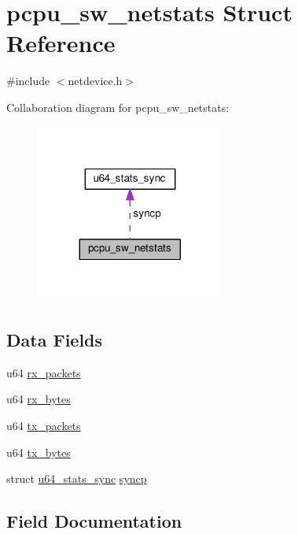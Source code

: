 \hypertarget{structpcpu__sw__netstats}{}\section{pcpu\+\_\+sw\+\_\+netstats Struct Reference}
\label{structpcpu__sw__netstats}


{\ttfamily \#include $<$netdevice.\+h$>$}



Collaboration diagram for pcpu\+\_\+sw\+\_\+netstats\+:
\nopagebreak
\begin{figure}[H]
\begin{center}
\leavevmode
\includegraphics[width=176pt]{structpcpu__sw__netstats__coll__graph}
\end{center}
\end{figure}
\subsection*{Data Fields}
\begin{DoxyCompactItemize}
\item 
u64 \hyperlink{structpcpu__sw__netstats_aef09f7c9a31a557c278f7768f6d54488}{rx\+\_\+packets}
\item 
u64 \hyperlink{structpcpu__sw__netstats_ae71ad7ad7c404b7820d022d42c515a70}{rx\+\_\+bytes}
\item 
u64 \hyperlink{structpcpu__sw__netstats_a1b3e22436ccc3b5d13124f481eb2261f}{tx\+\_\+packets}
\item 
u64 \hyperlink{structpcpu__sw__netstats_ab017757f36d020e04458ef3748fe1d69}{tx\+\_\+bytes}
\item 
struct \hyperlink{structu64__stats__sync}{u64\+\_\+stats\+\_\+sync} \hyperlink{structpcpu__sw__netstats_a09b11d813594941c06b3e1e818a9b543}{syncp}
\end{DoxyCompactItemize}


\subsection{Field Documentation}
\hypertarget{structpcpu__sw__netstats_ae71ad7ad7c404b7820d022d42c515a70}{}
